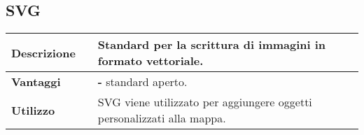 \vspace{40px}
\subsection{SVG}
\label{SVG}
\begin{table}[H]
	\centering
	\begin{tabular}{p{2cm}p{0.5cm}p{11.5cm}}
		\arrayrulecolor{lightgray}
		\toprule
		\textbf{Descrizione} & &
		Standard per la scrittura di immagini in formato vettoriale.
		\\ \midrule
		\textbf{Vantaggi} & &
		\textbf{- } standard aperto.
		\\ \midrule
		\textbf{Utilizzo} & &
		SVG viene utilizzato per aggiungere oggetti personalizzati alla mappa.
		\\\bottomrule
	\end{tabular}
\end{table}






